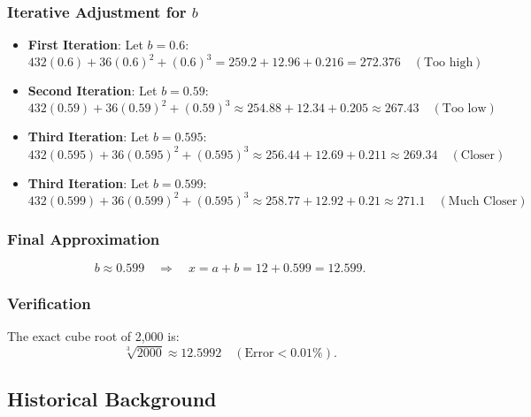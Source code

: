 \documentclass{article}
\begin{document}
\subsubsection{Iterative Adjustment for \( b \)}
\begin{itemize}
    \item \textbf{First Iteration}: Let \( b = 0.6 \):
    \[
    432(0.6) + 36(0.6)^2 + (0.6)^3 = 259.2 + 12.96 + 0.216 = 272.376 \quad (\text{Too high})
    \]
    
    \item \textbf{Second Iteration}: Let \( b = 0.59 \):
    \[
    432(0.59) + 36(0.59)^2 + (0.59)^3 \approx 254.88 + 12.34 + 0.205 \approx 267.43 \quad (\text{Too low})
    \]
    
    \item \textbf{Third Iteration}: Let \( b = 0.595 \):
    \[
    432(0.595) + 36(0.595)^2 + (0.595)^3 \approx 256.44 + 12.69 + 0.211 \approx 269.34 \quad (\text{Closer})
    \]

    \item \textbf{Third Iteration}: Let \( b = 0.599 \):
    \[
    432(0.599)+36(0.599)^2+(0.595)^3\approx 258.77+ 12.92+ 0.21 \approx 271.1 \quad(\text{Much Closer})
    \]
\end{itemize}

\subsubsection{Final Approximation}
\[
b \approx 0.599 \quad \Rightarrow \quad x = a + b = 12 + 0.599 = \boxed{12.599}.
\]

\subsubsection{Verification}
The exact cube root of 2,000 is:
\[
\sqrt[3]{2000} \approx 12.5992 \quad (\text{Error} < 0.01\%).
\]

\subsection{Historical Background}
\end{document}
